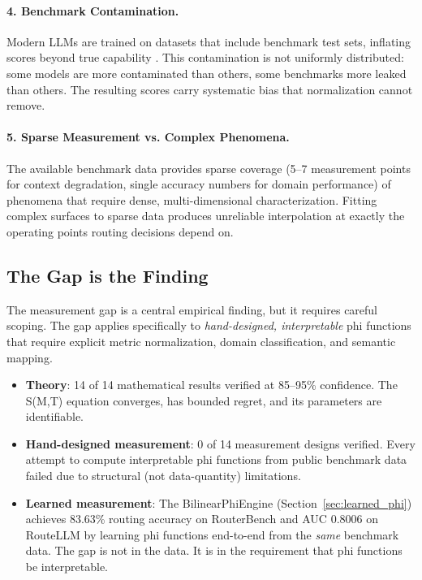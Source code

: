 \paragraph{4. Benchmark Contamination.} Modern LLMs are trained on datasets that include benchmark test sets, inflating scores beyond true capability \citep{deng2023leaderboards}. This contamination is not uniformly distributed: some models are more contaminated than others, some benchmarks more leaked than others. The resulting scores carry systematic bias that normalization cannot remove.

\paragraph{5. Sparse Measurement vs. Complex Phenomena.} The available benchmark data provides sparse coverage (5--7 measurement points for context degradation, single accuracy numbers for domain performance) of phenomena that require dense, multi-dimensional characterization. Fitting complex surfaces to sparse data produces unreliable interpolation at exactly the operating points routing decisions depend on.

\subsection{The Gap is the Finding}

The measurement gap is a central empirical finding, but it requires careful scoping. The gap applies specifically to \emph{hand-designed, interpretable} phi functions that require explicit metric normalization, domain classification, and semantic mapping.

\begin{itemize}
    \item \textbf{Theory}: 14 of 14 mathematical results verified at 85--95\% confidence. The S(M,T) equation converges, has bounded regret, and its parameters are identifiable.
    \item \textbf{Hand-designed measurement}: 0 of 14 measurement designs verified. Every attempt to compute interpretable phi functions from public benchmark data failed due to structural (not data-quantity) limitations.
    \item \textbf{Learned measurement}: The BilinearPhiEngine (Section~\ref{sec:learned_phi}) achieves 83.63\% routing accuracy on RouterBench and AUC 0.8006 on RouteLLM by learning phi functions end-to-end from the \emph{same} benchmark data. The gap is not in the data. It is in the requirement that phi functions be interpretable.
\end{itemize}

